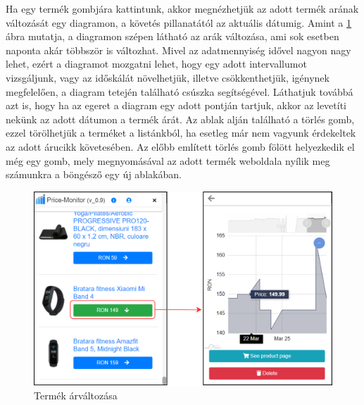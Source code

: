 Ha egy termék gombjára kattintunk, akkor megnézhetjük az adott termék arának változását egy diagramon, a követés pillanatától az aktuális dátumig. Amint a \ref{fig:ext_chart} ábra mutatja, a diagramon szépen látható az arák változása, ami sok esetben naponta akár többször is változhat. Mivel az adatmennyiség idővel nagyon nagy lehet, ezért a diagramot mozgatni lehet, hogy egy adott intervallumot vizsgáljunk, vagy az időskálát növelhetjük, illetve csökkenthetjük, igénynek megfelelően, a diagram tetején található csúszka segítségével. Láthatjuk továbbá azt is, hogy ha az egeret a diagram egy adott pontján tartjuk, akkor az levetíti nekünk az adott dátumon a termék árát. Az ablak alján található a törlés gomb, ezzel törölhetjük a terméket a listánkból, ha esetleg már nem vagyunk érdekeltek az adott árucikk követesében. Az előbb említett törlés gomb fölött helyezkedik el még egy gomb, mely megnyomásával az adott termék weboldala nyílik meg számunkra a böngésző egy új ablakában.

\begin{figure}[H]
    \centering
    \includegraphics[scale=1]{figures/images/home_details.png}
    \caption{Termék árváltozása}
    \label{fig:ext_chart}
\end{figure}

